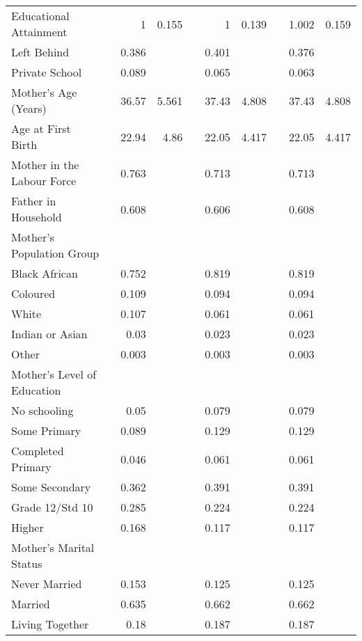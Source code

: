 \begin{table}[ht]
\begin{tabular}{llrrlrrlrr}
  Educational Attainment &  &     1 & 0.155 &  &     1 & 0.139 &  & 1.002 & 0.159 \\ 
  Left Behind &  & 0.386 &  &  & 0.401 &  &  & 0.376 &  \\ 
  Private School &  & 0.089 &  &  & 0.065 &  &  & 0.063 &  \\ 
  Mother's Age (Years) &  & 36.57 & 5.561 &  & 37.43 & 4.808 &  & 37.43 & 4.808 \\ 
  Age at First Birth &  & 22.94 &  4.86 &  & 22.05 & 4.417 &  & 22.05 & 4.417 \\ 
  Mother in the Labour Force &  & 0.763 &  &  & 0.713 &  &  & 0.713 &  \\ 
  Father in Household &  & 0.608 &  &  & 0.606 &  &  & 0.608 &  \\ 
   \multicolumn{2}{l}{Mother's Population Group} &  &  &  & & & & \\\phantom{M}Black African &  & 0.752 &  &  & 0.819 &  &  & 0.819 &  \\ 
  \phantom{M}Coloured &  & 0.109 &  &  & 0.094 &  &  & 0.094 &  \\ 
  \phantom{M}White &  & 0.107 &  &  & 0.061 &  &  & 0.061 &  \\ 
  \phantom{M}Indian or Asian &  &  0.03 &  &  & 0.023 &  &  & 0.023 &  \\ 
  \phantom{M}Other &  & 0.003 &  &  & 0.003 &  &  & 0.003 &  \\ 
   \multicolumn{2}{l}{Mother's Level of Education} &  &  &  & & & & \\\phantom{M}No schooling &  &  0.05 &  &  & 0.079 &  &  & 0.079 &  \\ 
  \phantom{M}Some Primary &  & 0.089 &  &  & 0.129 &  &  & 0.129 &  \\ 
  \phantom{M}Completed Primary &  & 0.046 &  &  & 0.061 &  &  & 0.061 &  \\ 
  \phantom{M}Some Secondary &  & 0.362 &  &  & 0.391 &  &  & 0.391 &  \\ 
  \phantom{M}Grade 12/Std 10 &  & 0.285 &  &  & 0.224 &  &  & 0.224 &  \\ 
  \phantom{M}Higher &  & 0.168 &  &  & 0.117 &  &  & 0.117 &  \\ 
   \multicolumn{2}{l}{Mother's Marital Status} &  &  &  & & & & \\\phantom{M}Never Married &  & 0.153 &  &  & 0.125 &  &  & 0.125 &  \\ 
  \phantom{M}Married &  & 0.635 &  &  & 0.662 &  &  & 0.662 &  \\ 
  \phantom{M}Living Together &  &  0.18 &  &  & 0.187 &  &  & 0.187 &  \\ 

\end{tabular}
\end{table}
